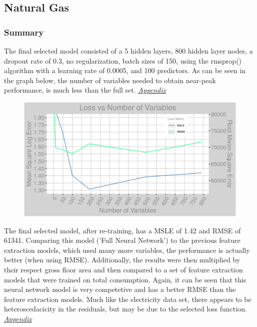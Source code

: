 \subsection{Natural Gas}
\subsubsection{Summary}
The final selected model consisted of a 5 hidden layers, 800 hidden layer nodes, a dropout rate of 0.3, no regularization, batch sizes of 150, using the rmsprop() algorithm with a learning rate of 0.0005, and 100 predictors.  As can be seen in the graph below, the number of variables needed to obtain near-peak performance, is much less than the full set. \textit{\hyperref[appendix_nn:natural_gas:nn_full]{Appendix}}

\begin{figure}[h]
\centering
\includegraphics[width=\textwidth, height=0.25\textheight]{Images/natural_gas_psf_nn_error.png}
\end{figure}

The final selected model, after re-training, has a MSLE of 1.42 and RMSE of 61341.  Comparing this model ('Full Neural Network') to the previous feature extraction models, which used many more variables, the performance is actually better (when using RMSE).  Additionally, the results were then multiplied by their respect gross floor area and then compared to a set of feature extraction models that were trained on total consumption.  Again, it can be seen that this neural network model is very competetive and has a better RMSE than the feature extraction models.  Much like the electricity data set, there appears to be heteroscedacicity in the residuals, but may be due to the selected loss function.  \textit{\hyperref[appendix_nn:natural_gas:nn_full_variables]{Appendix}}

